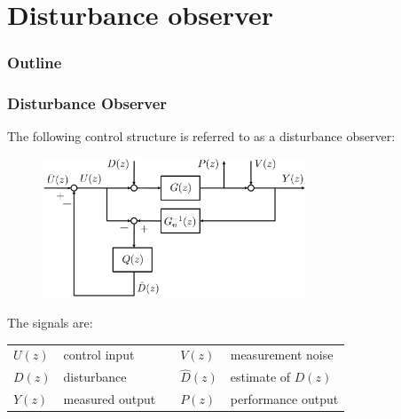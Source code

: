 \section{Disturbance observer}
\begin{frame}
    \frametitle{Outline}
    \tableofcontents[currentsection]
\end{frame}

\begin{frame}
    \frametitle{Disturbance Observer}

    The following control structure is referred to as a disturbance observer:
    \begin{figure}
        \includegraphics[width=0.7\textwidth]{Disturbance_Observer_DO}\\
    \end{figure}

    The signals are:

    \begin{center}
    \begin{tabular}{l @{ : } lll @{ : } l}
        $U(z)$ & control input && $V(z)$ & measurement noise \\
        $D(z)$ & disturbance && $\hat{D}(z)$ & estimate of $D(z)$ \\
        $Y(z)$ & measured output && $P(z)$ & performance output
    \end{tabular}
    \end{center}
\end{frame}

